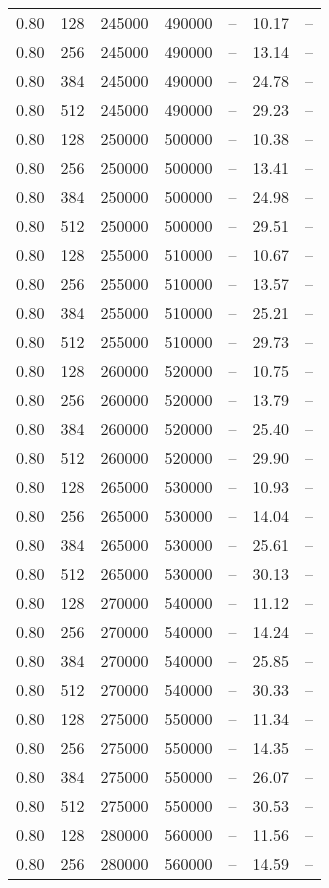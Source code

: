 \begin{tabular}{l|l|l|l|l|l|l}
0.80 & 128 & 245000 & 490000 & -- & 10.17 & --\\
0.80 & 256 & 245000 & 490000 & -- & 13.14 & --\\
0.80 & 384 & 245000 & 490000 & -- & 24.78 & --\\
0.80 & 512 & 245000 & 490000 & -- & 29.23 & --\\
0.80 & 128 & 250000 & 500000 & -- & 10.38 & --\\
0.80 & 256 & 250000 & 500000 & -- & 13.41 & --\\
0.80 & 384 & 250000 & 500000 & -- & 24.98 & --\\
0.80 & 512 & 250000 & 500000 & -- & 29.51 & --\\
0.80 & 128 & 255000 & 510000 & -- & 10.67 & --\\
0.80 & 256 & 255000 & 510000 & -- & 13.57 & --\\
0.80 & 384 & 255000 & 510000 & -- & 25.21 & --\\
0.80 & 512 & 255000 & 510000 & -- & 29.73 & --\\
0.80 & 128 & 260000 & 520000 & -- & 10.75 & --\\
0.80 & 256 & 260000 & 520000 & -- & 13.79 & --\\
0.80 & 384 & 260000 & 520000 & -- & 25.40 & --\\
0.80 & 512 & 260000 & 520000 & -- & 29.90 & --\\
0.80 & 128 & 265000 & 530000 & -- & 10.93 & --\\
0.80 & 256 & 265000 & 530000 & -- & 14.04 & --\\
0.80 & 384 & 265000 & 530000 & -- & 25.61 & --\\
0.80 & 512 & 265000 & 530000 & -- & 30.13 & --\\
0.80 & 128 & 270000 & 540000 & -- & 11.12 & --\\
0.80 & 256 & 270000 & 540000 & -- & 14.24 & --\\
0.80 & 384 & 270000 & 540000 & -- & 25.85 & --\\
0.80 & 512 & 270000 & 540000 & -- & 30.33 & --\\
0.80 & 128 & 275000 & 550000 & -- & 11.34 & --\\
0.80 & 256 & 275000 & 550000 & -- & 14.35 & --\\
0.80 & 384 & 275000 & 550000 & -- & 26.07 & --\\
0.80 & 512 & 275000 & 550000 & -- & 30.53 & --\\
0.80 & 128 & 280000 & 560000 & -- & 11.56 & --\\
0.80 & 256 & 280000 & 560000 & -- & 14.59 & --\\

\end{tabular}
